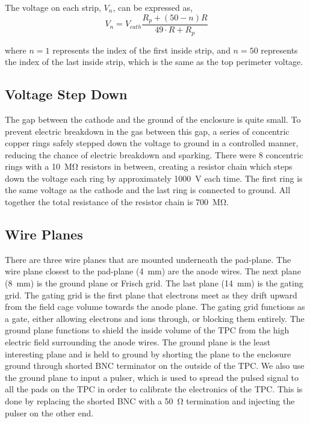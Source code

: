 The voltage on each strip, $V_n$, can be expressed as, 
\begin{equation}
V_n = V_{cath} \frac{R_p + (50 - n)R}{49\cdot R + R_p}
\label{eq:FCstrip}
\end{equation}

where $n = 1$ represents the index of the first inside strip, and $n= 50$ represents the index of the last inside strip, which is the same as the top perimeter voltage.





\subsection{Voltage Step Down}
The gap between the cathode and the ground of the enclosure is quite small. To prevent electric breakdown in the gas between this gap, a series of concentric copper rings safely stepped down the voltage to ground in a controlled manner, reducing the chance of electric breakdown and sparking. There were 8 concentric rings with a \SI{10}{\mega\ohm} resistors in between, creating a resistor chain which steps down the voltage each ring by approximately \SI{1000}{\volt} each time. The first ring is the same voltage as the cathode and the last ring is connected to ground. All together the total resistance of the resistor chain is \SI{700}{\mega\ohm}.


\subsection{Wire Planes}
\label{sec:wireplanes}

There are three wire planes that are mounted underneath the pad-plane. The wire plane closest to the pad-plane (\SI{4}{\milli\metre}) are the anode wires. The next plane (\SI{8}{\milli\metre}) is the ground plane or Frisch grid. The last plane (\SI{14}{\milli\metre}) is the gating grid. The gating grid is the first plane that electrons meet as they drift upward from the field cage volume towards the anode plane. The gating grid functions as a gate, either allowing electrons and ions through, or blocking them entirely. The ground plane functions to shield the inside volume of the TPC from the high electric field surrounding the anode wires. The ground plane is the least interesting plane and is held to ground by shorting the plane to the enclosure ground through shorted BNC terminator on the outside of the TPC. We also use the ground plane to input a pulser, which is used to spread the pulsed signal to all the pads on the TPC in order to calibrate the electronics of the TPC. This is done by replacing the shorted BNC with a \SI{50}{\ohm} termination and injecting the pulser on the other end. 


